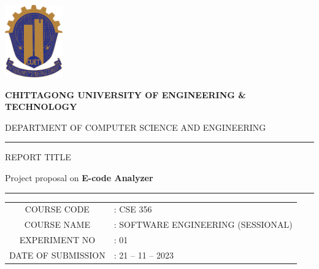 \documentclass[a4paper,12pt]{report}
\begin{document}
\begin{titlepage}
	\begin{minipage}[t][3cm][b]{.2\linewidth}
		\includegraphics[width=2.5cm, keepaspectratio]{cuet.png} \par \vspace{0.5cm}
	\end{minipage}
	\begin{minipage}[t][4cm][t]{.75\linewidth}
		\raggedleft
		\vspace{0.1cm}
		{\bfseries \Large CHITTAGONG UNIVERSITY OF ENGINEERING \& TECHNOLOGY}
		\par
		\vspace{.5cm}
		{DEPARTMENT OF COMPUTER SCIENCE AND ENGINEERING}
	\end{minipage}

	\centering

	\vspace{1cm}

	\raisebox{-\baselineskip}{\rule{\textwidth}{1px}}

	\rule{\textwidth}{1px}

	\vspace{0.2cm}
	{\large{{REPORT TITLE}}}\par \vspace{0.3cm}
	\Large{{Project proposal on \bfseries{E-code Analyzer}}}
	\rule{\textwidth}{2px}

	\vspace{0.5cm}

	\normalsize
	\begin{tabular}{cl}
		COURSE CODE        & : CSE 356                          \\
		COURSE NAME        & : SOFTWARE ENGINEERING (SESSIONAL) \\
		EXPERIMENT NO      & : 01                               \\
		DATE OF SUBMISSION & : 21 -- 11 -- 2023                 \\
	\end{tabular}


\end{titlepage}
\end{document}
